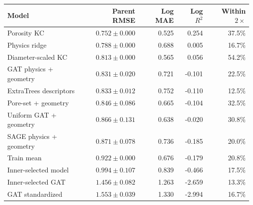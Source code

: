 \begin{tabular}{lrrrr}
\hline
Model & Parent RMSE & Log MAE & Log $R^2$ & Within $2\times$ \\
\hline
Porosity KC & $0.752\pm 0.000$ & 0.525 & 0.254 & 37.5\% \\
Physics ridge & $0.788\pm 0.000$ & 0.688 & 0.005 & 16.7\% \\
Diameter-scaled KC & $0.813\pm 0.000$ & 0.565 & 0.056 & 54.2\% \\
GAT physics + geometry & $0.831\pm 0.020$ & 0.721 & -0.101 & 22.5\% \\
ExtraTrees descriptors & $0.833\pm 0.012$ & 0.752 & -0.110 & 12.5\% \\
Pore-set + geometry & $0.846\pm 0.086$ & 0.665 & -0.104 & 32.5\% \\
Uniform GAT + geometry & $0.866\pm 0.131$ & 0.638 & -0.020 & 30.8\% \\
SAGE physics + geometry & $0.871\pm 0.078$ & 0.736 & -0.185 & 20.0\% \\
Train mean & $0.922\pm 0.000$ & 0.676 & -0.179 & 20.8\% \\
Inner-selected model & $0.994\pm 0.107$ & 0.839 & -0.466 & 17.5\% \\
Inner-selected GAT & $1.456\pm 0.082$ & 1.263 & -2.659 & 13.3\% \\
GAT standardized & $1.553\pm 0.039$ & 1.330 & -2.994 & 16.7\% \\
\hline
\end{tabular}
